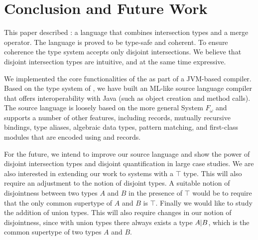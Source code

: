 \section{Conclusion and Future Work}
\label{sec:conclusion}


This paper described \name: a language that combines
intersection types and a merge operator.
The language is proved to be type-safe and coherent.
To ensure coherence the type system accepts only
disjoint intersections. We believe that disjoint intersection types are
intuitive, and at the same time expressive.

We implemented the core functionalities of the \name as part of a JVM-based
compiler. Based on the type system of \name, we have built an ML-like
source language compiler that offers interoperability with Java (such as object
creation and method calls). The source language is loosely based on the more
general System $F_{\omega}$ and supports a
number of other features, including records, mutually recursive
 bindings, type aliases, algebraic data types, pattern matching, and
first-class modules that are encoded using  and records.

For the future, we intend to improve our source language
and show the power of disjoint intersection types and disjoint
quantification in large case studies.
We are also interested in extending our work
to systems with a $\top$ type. This will also require an adjustment
to the notion of disjoint types. A suitable notion of
disjointness between two types $A$ and $B$ in the presence of $\top$
would be to require that the only common supertype of $A$ and $B$ is $\top$.
Finally we would like to study the
addition of union types. This will also require changes in our
notion of disjointness, since with union types there always exists
a type $A | B$, which is the common supertype of two
types $A$ and $B$.

